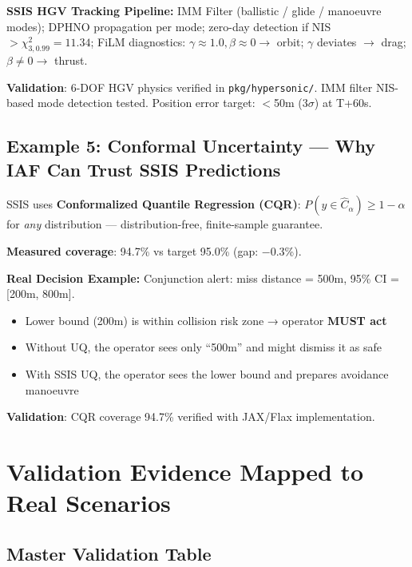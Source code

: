 \documentclass[11pt,a4paper]{article}
\begin{document}
\textbf{SSIS HGV Tracking Pipeline:} IMM Filter (ballistic / glide / manoeuvre modes); DPHNO propagation per mode; zero-day detection if NIS $> \chi^2_{3,0.99} = 11.34$; FiLM diagnostics: $\gamma\approx1.0,\beta\approx0\to$ orbit; $\gamma$ deviates $\to$ drag; $\beta\neq0\to$ thrust.

\textbf{Validation}: 6-DOF HGV physics verified in \texttt{pkg/hypersonic/}. IMM filter NIS-based mode detection tested. Position error target: $<$50m ($3\sigma$) at T+60s.

\subsection{Example 5: Conformal Uncertainty --- Why IAF Can Trust SSIS Predictions}

SSIS uses \textbf{Conformalized Quantile Regression (CQR)}: $P(y\in\hat{C}_\alpha)\ge 1-\alpha$ for \emph{any} distribution --- distribution-free, finite-sample guarantee.

\textbf{Measured coverage}: 94.7\% vs target 95.0\% (gap: $-$0.3\%).

\textbf{Real Decision Example:} Conjunction alert: miss distance = 500m, 95\% CI = [200m, 800m].
\begin{itemize}[noitemsep]
  \item Lower bound (200m) is within collision risk zone → operator \textbf{MUST act}
  \item Without UQ, the operator sees only ``500m'' and might dismiss it as safe
  \item With SSIS UQ, the operator sees the lower bound and prepares avoidance manoeuvre
\end{itemize}

\textbf{Validation}: CQR coverage 94.7\% verified with JAX/Flax implementation.

\newpage
\section{Validation Evidence Mapped to Real Scenarios}

\subsection{Master Validation Table}
\end{document}

